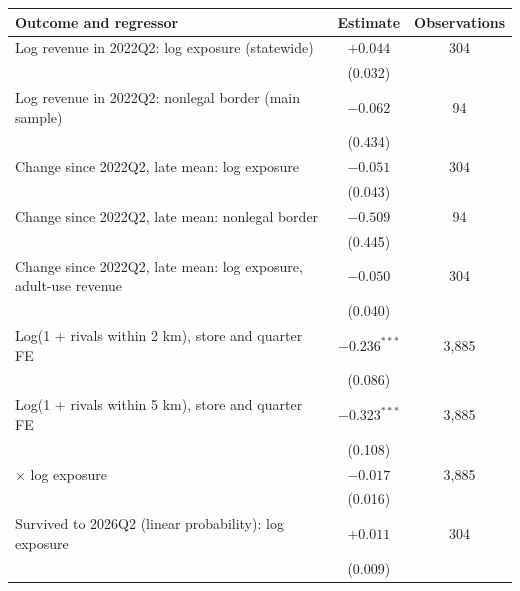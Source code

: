 \begin{tabular}{@{}lcc@{}}
\toprule
Outcome and regressor & Estimate & Observations \\
\midrule
Log revenue in 2022Q2: log exposure (statewide) & $+0.044$ & 304 \\
 & (0.032) & \\
Log revenue in 2022Q2: nonlegal border (main sample) & $-0.062$ & 94 \\
 & (0.434) & \\
Change since 2022Q2, late mean: log exposure & $-0.051$ & 304 \\
 & (0.043) & \\
Change since 2022Q2, late mean: nonlegal border & $-0.509$ & 94 \\
 & (0.445) & \\
Change since 2022Q2, late mean: log exposure, adult-use revenue & $-0.050$ & 304 \\
 & (0.040) & \\
Log(1 + rivals within 2 km), store and quarter FE & $-0.236^{***}$ & 3,885 \\
 & (0.086) & \\
Log(1 + rivals within 5 km), store and quarter FE & $-0.323^{***}$ & 3,885 \\
 & (0.108) & \\
\quad $\times$ log exposure & $-0.017$ & 3,885 \\
 & (0.016) & \\
Survived to 2026Q2 (linear probability): log exposure & $+0.011$ & 304 \\
 & (0.009) & \\
\bottomrule
\end{tabular}
